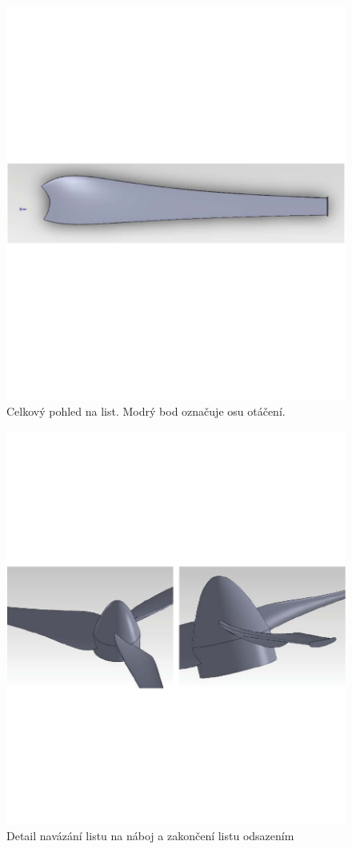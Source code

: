 \begin{figure}[H]
	\centering
	\includegraphics[]{obrazky/celek3}
	\caption{Celkový pohled na list. Modrý bod označuje osu otáčení.}
	\label{cel:2}
\end{figure}
\begin{figure}[H]
	\centering
	\includegraphics[]{obrazky/celek2}
	\caption{Detail navázání listu na náboj a zakončení listu odsazením}
	\label{cel:3}
\end{figure}
